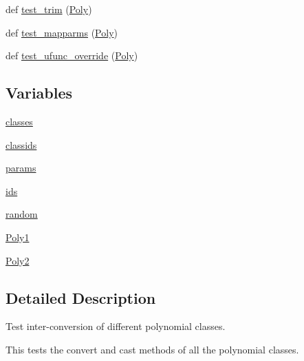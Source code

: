 \begin{DoxyCompactItemize}
\item 
def \hyperlink{namespacenumpy_1_1polynomial_1_1tests_1_1test__classes_ada00c40315b5ef224429a27c668432c3}{test\+\_\+trim} (\hyperlink{namespacenumpy_1_1polynomial_1_1tests_1_1test__classes_a09af6ac1aa253bd71e04c23e5869cfab}{Poly})
\item 
def \hyperlink{namespacenumpy_1_1polynomial_1_1tests_1_1test__classes_a635a372d011d38afa296257f83415e0d}{test\+\_\+mapparms} (\hyperlink{namespacenumpy_1_1polynomial_1_1tests_1_1test__classes_a09af6ac1aa253bd71e04c23e5869cfab}{Poly})
\item 
def \hyperlink{namespacenumpy_1_1polynomial_1_1tests_1_1test__classes_a744093be010f4e48a893afe469e0eac6}{test\+\_\+ufunc\+\_\+override} (\hyperlink{namespacenumpy_1_1polynomial_1_1tests_1_1test__classes_a09af6ac1aa253bd71e04c23e5869cfab}{Poly})
\end{DoxyCompactItemize}
\subsection*{Variables}
\begin{DoxyCompactItemize}
\item 
\hyperlink{namespacenumpy_1_1polynomial_1_1tests_1_1test__classes_a25c35ecb13253608601c4f443507109f}{classes}
\item 
\hyperlink{namespacenumpy_1_1polynomial_1_1tests_1_1test__classes_aa468c71584d5bdcdaf5589ca28988011}{classids}
\item 
\hyperlink{namespacenumpy_1_1polynomial_1_1tests_1_1test__classes_a6a42dc512e8b31a36d177b3e130f6a55}{params}
\item 
\hyperlink{namespacenumpy_1_1polynomial_1_1tests_1_1test__classes_a0ad9ed62188014655e9eb7447aa194b6}{ids}
\item 
\hyperlink{namespacenumpy_1_1polynomial_1_1tests_1_1test__classes_a750f030a2c51f0f49aaf76dad755be14}{random}
\item 
\hyperlink{namespacenumpy_1_1polynomial_1_1tests_1_1test__classes_a54efc46328824cf3b58834a4fa0d6528}{Poly1}
\item 
\hyperlink{namespacenumpy_1_1polynomial_1_1tests_1_1test__classes_a9f5bbd6e8d445e2c3b9fe4e608a9035b}{Poly2}
\end{DoxyCompactItemize}


\subsection{Detailed Description}
\begin{DoxyVerb}Test inter-conversion of different polynomial classes.

This tests the convert and cast methods of all the polynomial classes.\end{DoxyVerb}
 

